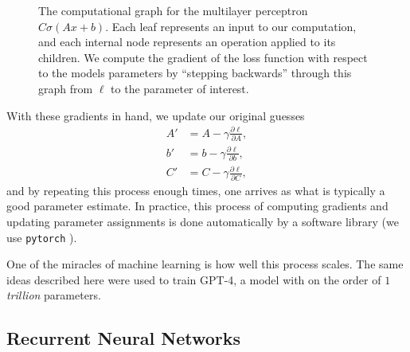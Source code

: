 \begin{figure}
	\centering
	\caption{The computational graph for the multilayer perceptron $C \sigma(Ax + b)$. Each leaf represents an input to our computation, and each internal node represents an operation applied to its children. We compute the gradient of the loss function with respect to the models parameters by ``stepping backwards'' through this graph from $\ell$ to the parameter of interest.}
	\label{fig:mlp-computational-graph}
\end{figure}

With these gradients in hand, we update our original guesses
\begin{equation}
	\begin{aligned}
		A' & = A - \gamma \frac{\partial \ell}{\partial A}, \\
		b' & = b - \gamma \frac{\partial \ell}{\partial b}, \\
		C' & = C - \gamma \frac{\partial \ell}{\partial C},
	\end{aligned}
\end{equation}
and by repeating this process enough times, one arrives as what is typically a good parameter estimate. In practice, this process of computing gradients and updating parameter assignments is done automatically by a software library (we use \texttt{pytorch} \cite{pytorch}).

One of the miracles of machine learning is how well this process scales. The same ideas described here were used to train GPT-4, a model with on the order of $1$ \emph{trillion} parameters.

\subsection{Recurrent Neural Networks}

